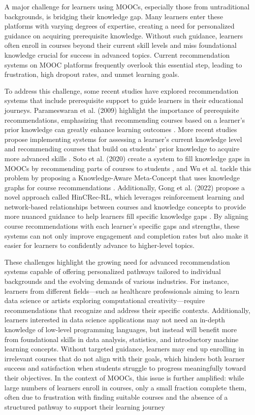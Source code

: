 A major challenge for learners using MOOCs, especially those from untraditional backgrounds, is bridging their knowledge gap. Many learners enter these platforms with varying degrees of expertise, creating a need for personalized guidance on acquiring prerequisite knowledge. Without such guidance, learners often enroll in courses beyond their current skill levels and miss foundational knowledge crucial for success in advanced topics. Current recommendation systems on MOOC platforms frequently overlook this essential step, leading to frustration, high dropout rates, and unmet learning goals.

To address this challenge, some recent studies have explored recommendation systems that include prerequisite support to guide learners in their educational journeys. Parameswaran et al. (2009) highlight the importance of prerequisite recommendations, emphasizing that recommending courses based on a learner’s prior knowledge can greatly enhance learning outcomes \cite{parameswaran_recommendations_2009}. More recent studies propose implementing systems for assessing a learner’s current knowledge level and recommending courses that build on students’ prior knowledge to acquire more advanced skills \cite{noauthor_building_2017}. Soto et al. (2020) create a system to fill knowledge gaps in MOOCs by recommending parts of courses to students \cite{noauthor_vista_nodate}, and Wu et al. tackle this problem by proposing a Knowledge-Aware Meta-Concept that uses knowledge graphs for course recommendations \cite{wu_meta_2024}. Additionally, Gong et al. (2022) propose a novel approach called HinCRec-RL, which leverages reinforcement learning and network-based relationships between courses and knowledge concepts to provide more nuanced guidance to help learners fill specific knowledge gaps \cite{noauthor_reinforced_nodate}. By aligning course recommendations with each learner’s specific gaps and strengths, these systems can not only improve engagement and completion rates but also make it easier for learners to confidently advance to higher-level topics.

These challenges highlight the growing need for advanced recommendation systems capable of offering personalized pathways tailored to individual backgrounds and the evolving demands of various industries. For instance, learners from different fields—such as healthcare professionals aiming to learn data science or artists exploring computational creativity—require recommendations that recognize and address their specific contexts. Additionally, learners interested in data science applications may not need an in-depth knowledge of low-level programming languages, but instead will benefit more from foundational skills in data analysis, statistics, and introductory machine learning concepts. Without targeted guidance, learners may end up enrolling in irrelevant courses that do not align with their goals, which hinders both learner success and satisfaction when students struggle to progress meaningfully toward their objectives. In the context of MOOCs, this issue is further amplified: while large numbers of learners enroll in courses, only a small fraction complete them, often due to frustration with finding suitable courses and the absence of a structured pathway to support their learning journey


